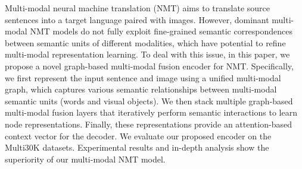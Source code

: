 Multi-modal neural machine translation (NMT) aims to translate source sentences into a target language paired with images. However, dominant multi-modal NMT models do not fully exploit fine-grained semantic correspondences between semantic units of different modalities, which have potential to refine multi-modal representation learning. To deal with this issue, in this paper, we propose a novel graph-based multi-modal fusion encoder for NMT. Specifically, we first represent the input sentence and image using a unified multi-modal graph, which captures various semantic relationships between multi-modal semantic units (words and visual objects). We then stack multiple graph-based multi-modal fusion layers that iteratively perform semantic interactions to learn node representations. Finally, these representations provide an attention-based context vector for the decoder. We evaluate our proposed encoder on the Multi30K datasets. Experimental results and in-depth analysis show the superiority of our multi-modal NMT model.
